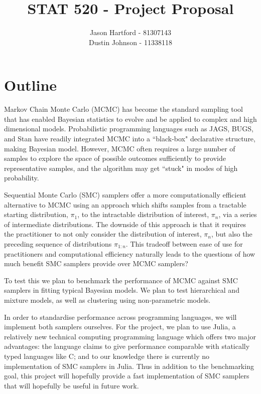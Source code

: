\documentclass[11pt, oneside]{amsart}
\title{STAT 520 - Project Proposal}
\author{Jason Hartford - 81307143 \\
Dustin Johnson - 11338118}
\begin{document}
\maketitle


\section{Outline}

Markov Chain Monte Carlo (MCMC) has become the standard sampling tool that has enabled Bayesian statistics to evolve and be applied to complex and high dimensional models. Probabilistic programming languages such as JAGS, BUGS, and Stan have readily integrated MCMC into a ``black-box" declarative structure, making Bayesian model. However, MCMC often requires a large number of samples to explore the space of possible outcomes sufficiently to provide representative samples, and the algorithm may get ``stuck" in modes of high probability.

Sequential Monte Carlo (SMC) samplers offer a more computationally efficient alternative to MCMC using an approach which shifts samples from a tractable starting distribution, $\pi_1$, to the intractable distribution of interest, $\pi_n$, via a series of intermediate distributions. The downside of this approach is that it requires the practitioner to not only consider the distribution of interest, $\pi_n$, but also the preceding sequence of distributions $\pi_{1:n}$. This tradeoff between ease of use for practitioners and computational efficiency naturally leads to the questions of how much benefit  SMC samplers provide over MCMC samplers?

To test this we plan to benchmark the performance of MCMC against SMC samplers in fitting typical Bayesian models. We plan to test hierarchical and mixture models, as well as clustering using non-parametric models. 

In order to standardise performance across programming languages, we will implement both samplers ourselves. For the project, we plan to use Julia, a relatively new technical computing programming language which offers two major advantages: the language claims to give performance comparable with statically typed languages like C; and to our knowledge there is currently no implementation of SMC samplers in Julia. Thus in addition to the benchmarking goal, this project will hopefully provide a fast implementation of SMC samplers that will hopefully be useful in future work.


% 
\end{document}
